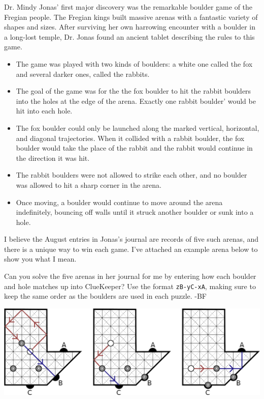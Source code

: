 Dr. Mindy Jonas' first major discovery was the remarkable boulder game of the Fregian people. 
The Fregian kings built massive arenas with a fantastic variety of shapes and sizes. 
After surviving her own harrowing encounter with a boulder in a long-lost temple, 
Dr. Jonas found an ancient tablet describing the rules to this game.

\begin{itemize}
\item The game was played with two kinds of boulders: a white one called the fox 
  and several darker ones, called the rabbits.
\item The goal of the game was for the the fox boulder to hit the rabbit boulders 
  into the holes at the edge of the arena. Exactly one rabbit boulder'
  would be hit into each hole.
\item The fox boulder could only be launched along the marked vertical, horizontal, and 
  diagonal trajectories. When it collided with a rabbit boulder, the fox boulder would 
  take the place of the rabbit and the rabbit would continue in the direction it was hit.
\item The rabbit boulders were not allowed to strike each other, and no boulder was 
  allowed to hit a sharp corner in the arena.
\item Once moving, a boulder would continue to move around the arena indefinitely, 
  bouncing off walls until it struck another boulder or sunk into a hole.
\end{itemize}

I believe the August entries in Jonas's journal are records of five such arenas, and
there is a unique way to win each game. I've attached an example arena below to show
you what I mean.

Can you solve the five arenas in her journal for me by entering how each boulder and
hole matches up into ClueKeeper? Use the format \texttt{zB-yC-xA}, making sure to
keep the same order as the boulders are used in each puzzle. -BF

\begin{center}
\includegraphics[width=\linewidth]{assets/Billiards_Puzzle_Tutorial.png}
\end{center}
